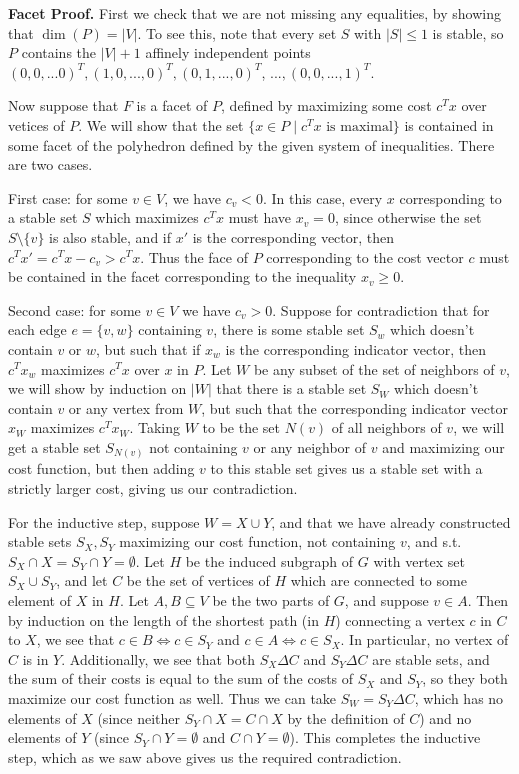 \documentclass[12pt]{article}
\begin{document}
\begin{enumerate}
\begin{enumerate}
{\bf Facet Proof.} First we check that we are not missing any equalities, by showing that $\dim(P) = |V|$. To see this, note that every set $S$ with $|S| \le 1$ is stable, so $P$ contains the $|V|+1$ affinely independent points $(0,0,...0)^T, (1,0,...,0)^T, (0,1,...,0)^T$, $..., (0,0,...,1)^T$.

Now suppose that $F$ is a facet of $P$, defined by maximizing some cost $c^Tx$ over vetices of $P$. We will show that the set $\{x \in P \mid c^Tx\text{ is maximal}\}$ is contained in some facet of the polyhedron defined by the given system of inequalities. There are two cases.

First case: for some $v \in V$, we have $c_v < 0$. In this case, every $x$ corresponding to a stable set $S$ which maximizes $c^Tx$ must have $x_v = 0$, since otherwise the set $S\setminus\{v\}$ is also stable, and if $x'$ is the corresponding vector, then $c^Tx' = c^Tx - c_v > c^Tx$. Thus the face of $P$ corresponding to the cost vector $c$ must be contained in the facet corresponding to the inequality $x_v \ge 0$.

Second case: for some $v \in V$ we have $c_v > 0$. Suppose for contradiction that for each edge $e = \{v,w\}$ containing $v$, there is some stable set $S_w$ which doesn't contain $v$ or $w$, but such that if $x_w$ is the corresponding indicator vector, then $c^Tx_w$ maximizes $c^Tx$ over $x$ in $P$. Let $W$ be any subset of the set of neighbors of $v$, we will show by induction on $|W|$ that there is a stable set $S_W$ which doesn't contain $v$ or any vertex from $W$, but such that the corresponding indicator vector $x_W$ maximizes $c^Tx_W$. Taking $W$ to be the set $N(v)$ of all neighbors of $v$, we will get a stable set $S_{N(v)}$ not containing $v$ or any neighbor of $v$ and maximizing our cost function, but then adding $v$ to this stable set gives us a stable set with a strictly larger cost, giving us our contradiction.

For the inductive step, suppose $W = X \cup Y$, and that we have already constructed stable sets $S_X, S_Y$ maximizing our cost function, not containing $v$, and s.t. $S_X \cap X = S_Y\cap Y = \emptyset$. Let $H$ be the induced subgraph of $G$ with vertex set $S_X \cup S_Y$, and let $C$ be the set of vertices of $H$ which are connected to some element of $X$ in $H$. Let $A,B \subseteq V$ be the two parts of $G$, and suppose $v \in A$. Then by induction on the length of the shortest path (in $H$) connecting a vertex $c$ in $C$ to $X$, we see that $c \in B \iff c \in S_Y$ and $c \in A \iff c \in S_X$. In particular, no vertex of $C$ is in $Y$. Additionally, we see that both $S_X\Delta C$ and $S_Y\Delta C$ are stable sets, and the sum of their costs is equal to the sum of the costs of $S_X$ and $S_Y$, so they both maximize our cost function as well. Thus we can take $S_W = S_Y\Delta C$, which has no elements of $X$ (since neither $S_Y \cap X = C \cap X$ by the definition of $C$) and no elements of $Y$ (since $S_Y \cap Y = \emptyset$ and $C \cap Y = \emptyset$). This completes the inductive step, which as we saw above gives us the required contradiction.


\end{enumerate}
\end{enumerate}
\end{document}
